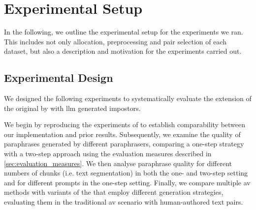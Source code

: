 \chapter{Experimental Setup}
\label{chap:experimental_setup}

In the following, we outline the experimental setup for the experiments we ran.
This includes not only allocation, preprocessing and pair selection of each dataset, but also a description and motivation for the experiments carried out.






\section{Experimental Design}
\label{sec:experimental_setup}

We designed the following experiments to systematically evaluate the extension of the original \impAppr{} by \citet{koppel_determining_2014} with \ac{llm} generated impostors. 

We begin by reproducing the experiments of \citet{koppel_determining_2014} to establish comparability between our implementation and prior results.
Subsequently, we examine the quality of paraphrases generated by different paraphrasers, comparing a one-step strategy with a two-step approach using the evaluation measures described in \autoref{sec:evaluation_measures}.
We then analyse paraphrase quality for different numbers of chunks (i.e. text segmentation) in both the one- and two-step setting and for different prompts in the one-step setting.
Finally, we compare multiple \ac{av} methods with variants of the \impAppr{} that employ different \imp{} generation strategies, evaluating them in the traditional \ac{av} scenario with human-authored text pairs.









% 

% 

% 








